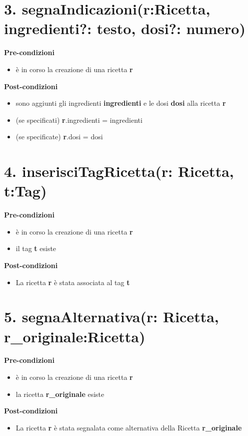 \documentclass[12pt]{extarticle}
\begin{document}
\section*{3. segnaIndicazioni(r:Ricetta, ingredienti?: testo, dosi?: numero)}

\textbf{Pre-condizioni}
\begin{itemize}
  \item è in corso la creazione di una ricetta  \textbf{r}
\end{itemize}
\textbf{Post-condizioni}
\begin{itemize}
  \item sono aggiunti gli ingredienti  \textbf{ingredienti} e le dosi  \textbf{dosi} alla ricetta \textbf{r}
  \item (se specificati) \textbf{r}.ingredienti = ingredienti
  \item (se specificate) \textbf{r}.dosi = dosi
\end{itemize}



\section*{4. inserisciTagRicetta(r: Ricetta, t:Tag)}

\textbf{Pre-condizioni}
\begin{itemize}
  \item è in corso la creazione di una ricetta  \textbf{r}
  \item il tag \textbf{t} esiste
\end{itemize}
\textbf{Post-condizioni}
\begin{itemize}
  \item La ricetta  \textbf{r} è stata associata al tag \textbf{t} 
\end{itemize}

\section*{5. segnaAlternativa(r: Ricetta, r\_originale:Ricetta)}

\textbf{Pre-condizioni}
\begin{itemize}
  \item è in corso la creazione di una ricetta  \textbf{r}
  \item la ricetta \textbf{r\_originale} esiste
\end{itemize}
\textbf{Post-condizioni}
\begin{itemize}
  \item La ricetta  \textbf{r} è stata segnalata come alternativa della Ricetta  \textbf{r\_originale}
\end{itemize}
\end{document}
